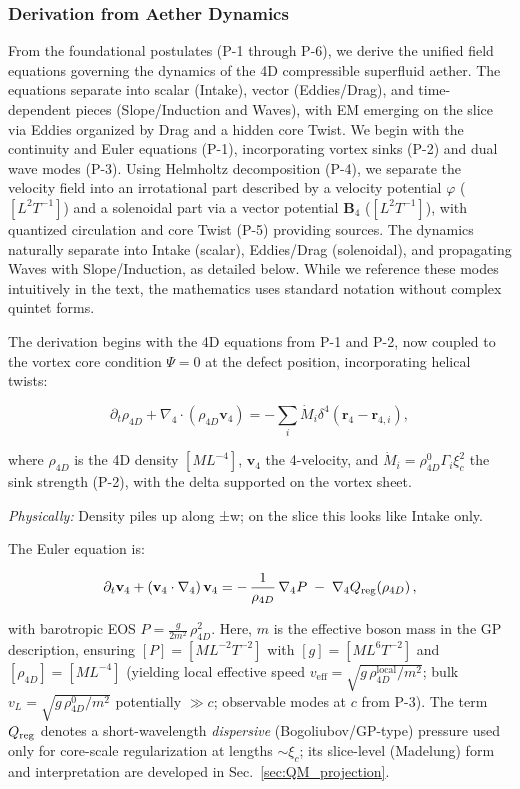 \subsubsection{Derivation from Aether Dynamics}

From the foundational postulates (P-1 through P-6), we derive the unified field equations governing the dynamics of the 4D compressible superfluid aether. The equations separate into scalar (Intake), vector (Eddies/Drag), and time-dependent pieces (Slope/Induction and Waves), with EM emerging on the slice via Eddies organized by Drag and a hidden core Twist. We begin with the continuity and Euler equations (P-1), incorporating vortex sinks (P-2) and dual wave modes (P-3). Using Helmholtz decomposition (P-4), we separate the velocity field into an irrotational part described by a velocity potential $\varphi$ ($[L^2 T^{-1}]$) and a solenoidal part via a vector potential $\mathbf{B}_4$ ($[L^2 T^{-1}]$), with quantized circulation and core Twist (P-5) providing sources. The dynamics naturally separate into Intake (scalar), Eddies/Drag (solenoidal), and propagating Waves with Slope/Induction, as detailed below. While we reference these modes intuitively in the text, the mathematics uses standard notation without complex quintet forms.

The derivation begins with the 4D equations from P-1 and P-2, now coupled to the vortex core condition $\Psi=0$ at the defect position, incorporating helical twists:

\begin{equation}
\partial_t \rho_{4D} + \nabla_4 \cdot (\rho_{4D} \mathbf{v}_4) = -\sum_i \dot{M}_i \delta^4(\mathbf{r}_4 - \mathbf{r}_{4,i}),
\end{equation}

where $\rho_{4D}$ is the 4D density $[M L^{-4}]$, $\mathbf{v}_4$ the 4-velocity, and $\dot{M}_i = \rho_{4D}^0 \Gamma_i \xi_c^2$ the sink strength (P-2), with the delta supported on the vortex sheet.

\textit{Physically:} Density piles up along ±w; on the slice this looks like Intake only.

The Euler equation is:

\begin{equation}
\partial_t \mathbf{v}_4 + (\mathbf{v}_4 \cdot \nabla_4)\,\mathbf{v}_4
= -\,\frac{1}{\rho_{4D}}\,\nabla_4 P \;-\; \nabla_4 Q_{\rm reg}(\rho_{4D})\,,
\end{equation}

with barotropic EOS $P=\tfrac{g}{2m^{2}}\,\rho_{4D}^{2}$. Here, $m$ is the effective boson mass in the GP description, ensuring $[P]=[M L^{-2}T^{-2}]$ with $[g]=[M L^6T^{-2}]$ and $[\rho_{4D}]=[M L^{-4}]$ (yielding local effective speed $v_{\text{eff}}=\sqrt{g\,\rho_{4D}^{\text{local}}/m^{2}}$; bulk $v_L=\sqrt{g\,\rho_{4D}^0/m^{2}}$ potentially $\gg c$; observable modes at $c$ from P-3). The term $Q_{\rm reg}$ denotes a short-wavelength \emph{dispersive} (Bogoliubov/GP-type) pressure used only for core-scale regularization at lengths $\sim\xi_c$; its slice-level (Madelung) form and interpretation are developed in Sec.~\ref{sec:QM_projection}.

